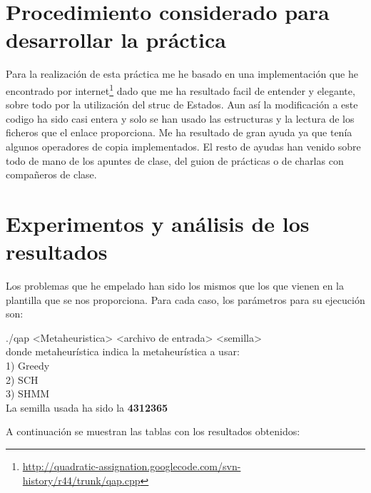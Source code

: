 \section{Procedimiento considerado para desarrollar la práctica}
Para la realización de esta práctica me he basado en una implementación que he encontrado por internet\footnote{\url{http://quadratic-assignation.googlecode.com/svn-history/r44/trunk/qap.cpp}} dado que me ha resultado facil de entender y elegante, sobre todo por la utilización del struc de Estados. Aun así la modificación a este codigo ha sido casi entera y solo se han usado las estructuras y la lectura de los ficheros que el enlace proporciona. Me ha resultado de gran ayuda ya que tenía algunos operadores de copia implementados. El resto de ayudas han venido sobre todo de mano de los apuntes de clase, del guion de prácticas o de charlas con compañeros de clase.
\newpage
\section{Experimentos y análisis de los resultados}

Los problemas que he empelado han sido los mismos que los que vienen en la plantilla que se nos proporciona. Para cada caso, los parámetros para su ejecución son:

./qap <Metaheuristica> <archivo de entrada> <semilla>\\

donde metaheurística indica la metaheurística a usar:\\
1) Greedy\\
2) SCH\\
3) SHMM\\


La semilla usada ha sido la \textbf{4312365} 

A continuación se muestran las tablas con los resultados obtenidos:

